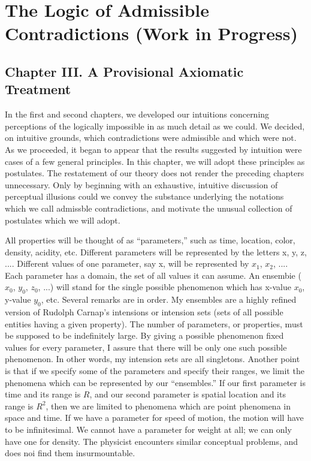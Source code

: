 \chapter{The Logic of Admissible Contradictions (Work in Progress)}

\section{Chapter III. A Provisional Axiomatic Treatment}


In the first and second chapters, we developed our intuitions 
concerning perceptions of the logically impossible in as much detail as we 
could. We decided, on intuitive grounds, which contradictions were 
admissible and which were not. As we proceeded, it began to appear that the 
results suggested by intuition were cases of a few general principles. In this 
chapter, we will adopt these principles as postulates. The restatement of our 
theory does not render the preceding chapters unnecessary. Only by 
beginning with an exhaustive, intuitive discussion of perceptual illusions 
could we convey the substance underlying the notations which we call 
admissble contradictions, and motivate the unusual collection of postulates 
which we will adopt. 

All properties will be thought of as \enquote{parameters,} such as time, 
location, color, density, acidity, etc. Different parameters will be represented 
by the letters x, y, z, .... Different values of one parameter, say x, will be 
represented by $x_1$, $x_2$, .... Each parameter has a domain, the set of all values 
it can assume. An ensembie ($x_0$, $y_0$, $z_0$, ...) will stand for the single possible 
phenomenon which has x-value $x_0$, y-value $y_0$, etc. Several remarks are in 
order. My ensembles are a highly refined version of Rudolph Carnap's 
intensions or intension sets (sets of all possible entities having a given 
property). The number of parameters, or properties, must be supposed to be 
indefinitely large. By giving a possible phenomenon fixed values for every 
parameter, I assure that there will be only one such possible phenomenon. In 
other words, my intension sets are all singletons. Another point is that if we 
specify some of the parameters and specify their ranges, we limit the 
phenomena which can be represented by our \enquote{ensembles.} If our first 
parameter is time and its range is $R$, and our second parameter is spatial 
location and its range is $R^2$, then we are limited to phenomena which are 
point phenomena in space and time. If we have a parameter for speed of 
motion, the motion will have to be infinitesimal. We cannot have a 
parameter for weight at all; we can only have one for density. The physicist 
encounters similar conceptual problems, and does noi find them 
insurmountable. 

